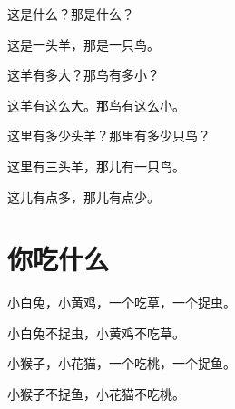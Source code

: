 \documentclass[12pt,UTF-8,openany]{ctexbook}
\begin{document}
\begin{large}
    
    这是什么？那是什么？
    
    这是一头羊，那是一只鸟。
    
    这羊有多大？那鸟有多小？
    
    这羊有这么大。那鸟有这么小。
    
    这里有多少头羊？那里有多少只鸟？
    
    这里有三头羊，那儿有一只鸟。
    
    这儿有点多，那儿有点少。
    
\end{large}


\clearpage

\begin{center}
    
\end{center}


\hanzibox{}\hanzibox{}\hanzibox{}\hanzibox{}\hspace{1em}\hanzibox{}\hanzibox{}\hanzibox{}\hanzibox{}

\hanzibox{}\hanzibox{}\hanzibox{}\hanzibox{}\hspace{1em}\hanzibox{}\hanzibox{}\hanzibox{}\hanzibox{}

\hanzibox{}\hanzibox{}\hanzibox{}\hanzibox{}\hspace{1em}\hanzibox{}\hanzibox{}\hanzibox{}\hanzibox{}






\chapter{你吃什么}

\begin{large}
    
    小白兔，小黄鸡，一个吃草，一个捉虫。
    
    小白兔不捉虫，小黄鸡不吃草。
    
    小猴子，小花猫，一个吃桃，一个捉鱼。
    
    小猴子不捉鱼，小花猫不吃桃。
    
\end{large}


\clearpage

\begin{center}
    
\end{center}
\end{document}
